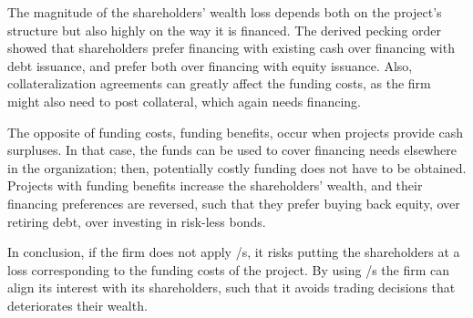 \documentclass[main.tex]{subfiles}
\begin{document}
    The magnitude of the shareholders' wealth loss depends both on the project's structure
    but also highly on the way it is financed. 
    The derived pecking order showed that shareholders prefer 
    financing with existing cash over financing with debt issuance, 
    and prefer both over financing with equity issuance.
    Also, collateralization agreements can greatly affect the funding costs,
    as the firm might also need to post collateral, which again needs financing.

    The opposite of funding costs, funding benefits, occur when projects provide cash surpluses.
    In that case, the funds can be used to cover financing needs elsewhere in the organization;
    then, potentially costly funding does not have to be obtained.
    \\
    Projects with funding benefits increase the shareholders' wealth,
    and their financing preferences are reversed, 
    such that they prefer buying back equity, over retiring debt, over investing in risk-less bonds.

    In conclusion, if the firm does not apply \FVA/s, it risks putting the shareholders at a loss
    corresponding to the funding costs of the project.
    By using \FVA/s the firm can align its interest with its shareholders,
    such that it avoids trading decisions that deteriorates their wealth. 
\end{document}
